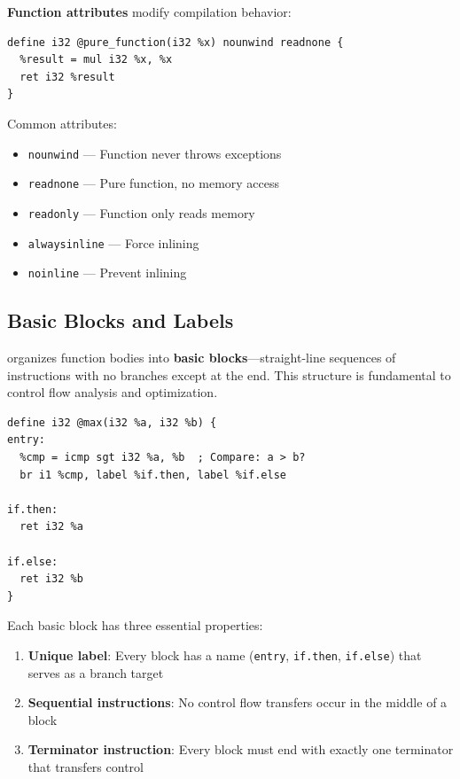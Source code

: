 \textbf{Function attributes} modify compilation behavior:

\begin{lstlisting}[style=ir]
define i32 @pure_function(i32 %x) nounwind readnone {
  %result = mul i32 %x, %x
  ret i32 %result
}
\end{lstlisting}

Common attributes:
\begin{itemize}[noitemsep]
  \item \texttt{nounwind} --- Function never throws exceptions
  \item \texttt{readnone} --- Pure function, no memory access
  \item \texttt{readonly} --- Function only reads memory
  \item \texttt{alwaysinline} --- Force inlining
  \item \texttt{noinline} --- Prevent inlining
\end{itemize}

\subsection{Basic Blocks and Labels}

 organizes function bodies into \textbf{basic blocks}---straight-line sequences of instructions with no branches except at the end. This structure is fundamental to control flow analysis and optimization.

\begin{lstlisting}[style=ir]
define i32 @max(i32 %a, i32 %b) {
entry:
  %cmp = icmp sgt i32 %a, %b  ; Compare: a > b?
  br i1 %cmp, label %if.then, label %if.else

if.then:
  ret i32 %a

if.else:
  ret i32 %b
}
\end{lstlisting}

Each basic block has three essential properties:

\begin{enumerate}[noitemsep]
  \item \textbf{Unique label}: Every block has a name (\texttt{entry}, \texttt{if.then}, \texttt{if.else}) that serves as a branch target
  \item \textbf{Sequential instructions}: No control flow transfers occur in the middle of a block
  \item \textbf{Terminator instruction}: Every block must end with exactly one terminator that transfers control
\end{enumerate}

